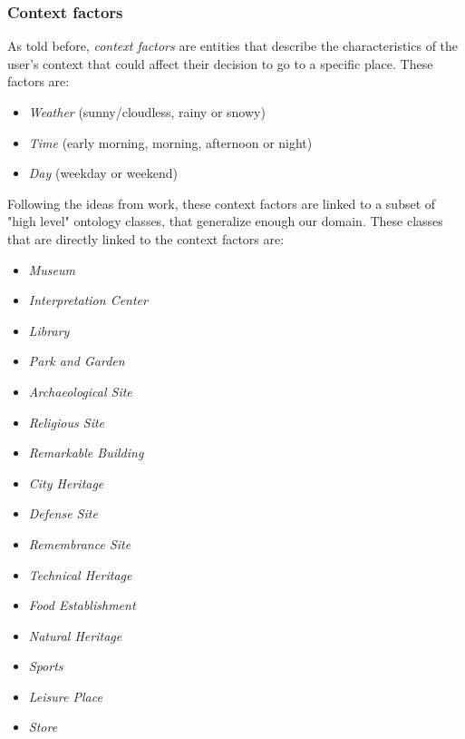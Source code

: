 \documentclass{article}
\begin{document}
\subsubsection{Context factors} \label{section:context_factors}
As told before, \textit{context factors} are entities that describe the characteristics of the user's context that could affect their decision to go to a specific place. These factors are: 
\begin{itemize}
    \item \textit{Weather} (sunny/cloudless, rainy or snowy)
    \item \textit{Time} (early morning, morning, afternoon or night)
    \item \textit{Day} (weekday or weekend)
\end{itemize}
Following the ideas from \cite{bahramian_abbaspour_claramunt_2017} work, these context factors are linked to a subset of "high level" ontology classes, that generalize enough our domain. These classes that are directly linked to the context factors are:
\begin{itemize}
    \item \textit{Museum}
    \item \textit{Interpretation Center}
    \item \textit{Library}
    \item \textit{Park and Garden}
    \item \textit{Archaeological Site}
    \item \textit{Religious Site}
    \item \textit{Remarkable Building}
    \item \textit{City Heritage}
    \item \textit{Defense Site}
    \item \textit{Remembrance Site}
    \item \textit{Technical Heritage}
    \item \textit{Food Establishment}
    \item \textit{Natural Heritage}
    \item \textit{Sports}
    \item \textit{Leisure Place}
    \item \textit{Store}
\end{itemize}
 
\end{document}
